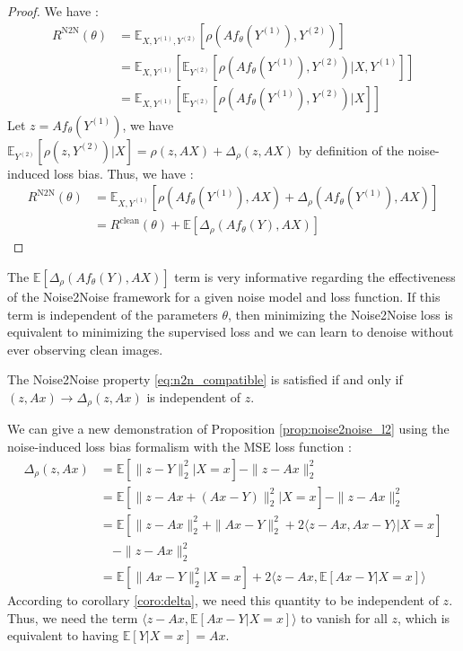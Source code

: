 \begin{proof}
    We have :
    \begin{align*}
        R^{\text{N2N}}(\theta) &= \mathbb{E}_{X, Y^{(1)}, Y^{(2)}}[\rho(Af_\theta(Y^{(1)}), Y^{(2)})] \\
        &= \mathbb{E}_{X, Y^{(1)}}[\mathbb{E}_{Y^{(2)}}[\rho(Af_\theta(Y^{(1)}), Y^{(2)}) | X, Y^{(1)}]] \\
        &= \mathbb{E}_{X, Y^{(1)}}[\mathbb{E}_{Y^{(2)}}[\rho(Af_\theta(Y^{(1)}), Y^{(2)}) | X]]
    \end{align*}
    Let $z = Af_\theta(Y^{(1)})$, we have $\mathbb{E}_{Y^{(2)}}[\rho(z, Y^{(2)}) | X] = \rho(z, AX) + \Delta_\rho(z, AX)$ by definition of the noise-induced loss bias. Thus, we have :
    \begin{align*}
        R^{\text{N2N}}(\theta) &= \mathbb{E}_{X, Y^{(1)}}[\rho(Af_\theta(Y^{(1)}), AX) + \Delta_\rho(Af_\theta(Y^{(1)}), AX)] \\
        &= R^{\text{clean}}(\theta) + \mathbb{E}[\Delta_\rho(Af_\theta(Y), AX)]
    \end{align*}
\end{proof}

The $\mathbb{E}[\Delta_\rho(Af_\theta(Y), AX)]$ term is very informative regarding the effectiveness of the Noise2Noise framework for a given noise model and loss function.
If this term is independent of the parameters $\theta$, then minimizing the Noise2Noise loss is equivalent to minimizing the supervised loss and we can learn to denoise without ever observing clean images.

\begin{corollary}
    \label{coro:delta}
    The Noise2Noise property \eqref{eq:n2n_compatible} is satisfied if and only if $(z, Ax) \to \Delta_\rho(z, Ax)$ is independent of $z$.
\end{corollary}

We can give a new demonstration of Proposition \ref{prop:noise2noise_l2} using the noise-induced loss bias formalism with the MSE loss function :
\begin{align*}
    \Delta_\rho(z, Ax) &= \mathbb{E}[\| z - Y \|_2^2 | X=x] - \| z - Ax \|_2^2 \\
    &= \mathbb{E}[\| z - Ax + (Ax - Y) \|_2^2 | X=x] - \| z - Ax \|_2^2 \\
    &= \mathbb{E}[\| z - Ax \|_2^2 + \| Ax - Y \|_2^2 + 2 \langle z - Ax, Ax - Y \rangle | X=x] \\
    &\quad - \| z - Ax \|_2^2 \\
    &= \mathbb{E}[\| Ax - Y \|_2^2 | X=x] + 2 \langle z - Ax, \mathbb{E}[Ax - Y | X=x] \rangle
\end{align*}
\noindent According to corollary \ref{coro:delta}, we need this quantity to be independent of $z$. Thus, we need the term $\langle z - Ax, \mathbb{E}[Ax - Y | X=x] \rangle$ to vanish for all $z$, which is equivalent to having $\mathbb{E}[Y | X=x] = Ax$.

